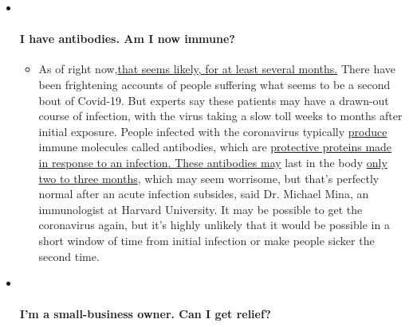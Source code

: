 \begin{itemize}
\item ~
  \hypertarget{i-have-antibodies-am-i-now-immune}{%
  \paragraph{I have antibodies. Am I now
  immune?}\label{i-have-antibodies-am-i-now-immune}}

  \begin{itemize}
  \tightlist
  \item
    As of right
    now,\href{https://www.nytimes3xbfgragh.onion/2020/07/22/health/covid-antibodies-herd-immunity.html?action=click\&pgtype=Article\&state=default\&region=MAIN_CONTENT_3\&context=storylines_faq}{that
    seems likely, for at least several months.} There have been
    frightening accounts of people suffering what seems to be a second
    bout of Covid-19. But experts say these patients may have a
    drawn-out course of infection, with the virus taking a slow toll
    weeks to months after initial exposure. People infected with the
    coronavirus typically
    \href{https://www.nature.com/articles/s41586-020-2456-9}{produce}
    immune molecules called antibodies, which are
    \href{https://www.nytimes3xbfgragh.onion/2020/05/07/health/coronavirus-antibody-prevalence.html?action=click\&pgtype=Article\&state=default\&region=MAIN_CONTENT_3\&context=storylines_faq}{protective
    proteins made in response to an
    infection}\href{https://www.nytimes3xbfgragh.onion/2020/05/07/health/coronavirus-antibody-prevalence.html?action=click\&pgtype=Article\&state=default\&region=MAIN_CONTENT_3\&context=storylines_faq}{.
    These antibodies may} last in the body
    \href{https://www.nature.com/articles/s41591-020-0965-6}{only two to
    three months}, which may seem worrisome, but that's perfectly normal
    after an acute infection subsides, said Dr. Michael Mina, an
    immunologist at Harvard University. It may be possible to get the
    coronavirus again, but it's highly unlikely that it would be
    possible in a short window of time from initial infection or make
    people sicker the second time.
  \end{itemize}
\item ~
  \hypertarget{im-a-small-business-owner-can-i-get-relief}{%
  \paragraph{I'm a small-business owner. Can I get
  relief?}\label{im-a-small-business-owner-can-i-get-relief}}


\end{itemize}
